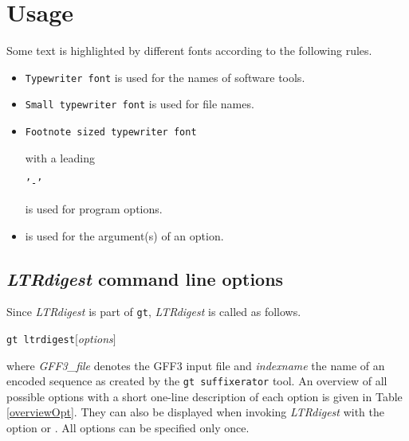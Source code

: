 \documentclass[12pt,titlepage]{article}
\newcommand{\LTRdigest}{\textit{LTRdigest}\xspace}
\newcommand{\GtLTRdigest}{\texttt{gt ltrdigest}\xspace}
\newcommand{\Gt}{\texttt{gt}\xspace}
\newcommand{\Gtsuffixerator}{\texttt{gt suffixerator}\xspace}
\begin{document}
\section{Usage} \label{Usage}

Some text is highlighted by different fonts according to the following rules.

\begin{itemize}
\item \texttt{Typewriter font} is used for the names of software tools.
\item \texttt{\small{Small typewriter font}} is used for file names.
\item \begin{footnotesize}\texttt{Footnote sized typewriter font}
      \end{footnotesize} with a leading
      \begin{footnotesize}\texttt{'-'}\end{footnotesize}
      is used for program options.
\item {} is used for the argument(s) of an
      option.
\end{itemize}

\subsection{\LTRdigest command line options}

Since \LTRdigest is part of \Gt, \LTRdigest is called as follows.

\GtLTRdigest  $[$\emph{options}$]$  

where \emph{GFF3\_file} denotes the GFF3 input file and \emph{indexname} the name of an encoded sequence as created by the \Gtsuffixerator tool.
An overview of all possible options with a short one-line description of
each option is given in Table \ref{overviewOpt}. They can also be displayed when invoking \LTRdigest with the option  or .
All options can be specified only once.
\end{document}
